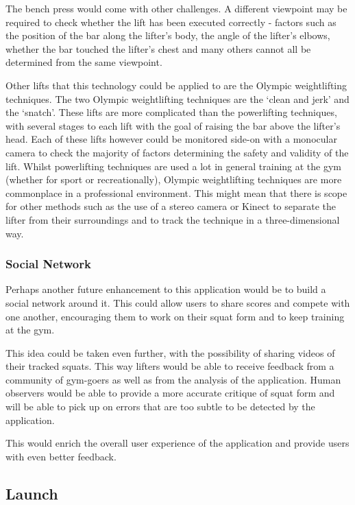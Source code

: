 The bench press would come with other challenges. A different viewpoint may be required to check whether the lift has been executed correctly - factors such as the position of the bar along the lifter's body, the angle of the lifter's elbows, whether the bar touched the lifter's chest and many others cannot all be determined from the same viewpoint.

Other lifts that this technology could be applied to are the Olympic weightlifting techniques. The two Olympic weightlifting techniques are the `clean and jerk' and the `snatch'. These lifts are more complicated than the powerlifting techniques, with several stages to each lift with the goal of raising the bar above the lifter's head. Each of these lifts however could be monitored side-on with a monocular camera to check the majority of factors determining the safety and validity of the lift. Whilst powerlifting techniques are used a lot in general training at the gym (whether for sport or recreationally), Olympic weightlifting techniques are more commonplace in a professional environment. This might mean that there is scope for other methods such as the use of a stereo camera or Kinect to separate the lifter from their surroundings and to track the technique in a three-dimensional way. 

\subsubsection{Social Network}

Perhaps another future enhancement to this application would be to build a social network around it. This could allow users to share scores and compete with one another, encouraging them to work on their squat form and to keep training at the gym.

This idea could be taken even further, with the possibility of sharing videos of their tracked squats. This way lifters would be able to receive feedback from a community of gym-goers as well as from the analysis of the application. Human observers would be able to provide a more accurate critique of squat form and will be able to pick up on errors that are too subtle to be detected by the application.

This would enrich the overall user experience of the application and provide users with even better feedback.

\subsection{Launch}

